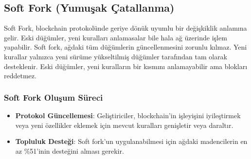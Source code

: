 \subsection{Soft Fork (Yumuşak Çatallanma)}

Soft Fork, blockchain protokolünde geriye dönük uyumlu bir değişkiklik anlamına gelir. Eski düğümler, yeni kuralları anlamasalar bile hala ağ üzerinde işlem yapabilir. Soft fork, ağdaki tüm düğümlerin güncellenmesini zorunlu kılmaz. Yeni kurallar yalnızca yeni sürüme yükseltilmiş düğümler tarafından tam olarak desteklenir. Eski düğümler, yeni kuralların bir kısmını anlamayabilir ama blokları reddetmez. 

\subsubsection{Soft Fork Oluşum Süreci}

\begin{itemize}
    \item \textbf{Protokol Güncellemesi}: Geliştiriciler, blockchain'in işleyişini iyileştirmek veya yeni özellikler eklemek için mevcut kuralları genişletir veya daraltır.
    \item \textbf{Topluluk Desteği}: Soft fork'un uygulanabilmesi için ağdaki madencilerin en az \%51'inin desteğini alması gerekir.
\end{itemize}

\newpage